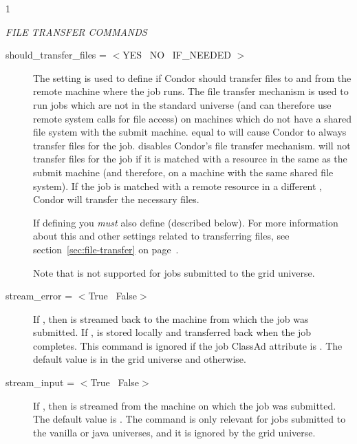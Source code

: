 \begin{ManPage}{\label{man-condor-submit}}{1}
\begin{description}
\end{description} 

\emph{FILE TRANSFER COMMANDS}
\begin{description} 


\item[should\_transfer\_files = $<$YES \Bar\ NO \Bar\ IF\_NEEDED $>$] 
The  setting is used to define if Condor
should transfer files to and from the remote machine where the job
runs.
The file transfer mechanism is used to run jobs which are not in the
standard universe (and can therefore use remote system calls for file
access) on machines which do not have a shared file system with the
submit machine.
 equal to  will cause Condor to
always transfer files for the job.
 disables Condor's file transfer mechanism.
 will not transfer files for the job if it is matched
with a resource in the same  as the submit
machine (and therefore, on a machine with the same shared file
system).
If the job is matched with a remote resource in a different 
, Condor will transfer the necessary files. 

If defining  you \emph{must} also
define  (described below).
For more information about this and other settings related to
transferring files, see section~\ref{sec:file-transfer} on
page~\pageref{sec:file-transfer}.

Note that  is not supported
for jobs submitted to the grid universe.

\item[stream\_error = $<$True \Bar\ False$>$]
If , then  is streamed back to
the machine from which the job was submitted.
If ,  is stored locally
and transferred back when the job completes.
This command is ignored if the job ClassAd attribute
 is
.
The default value is  in the grid
universe and  otherwise.

\item[stream\_input = $<$True \Bar\ False$>$]
If , then  is streamed from the
machine on which the job was submitted.
The default value is .
The command is only relevant for jobs submitted to
the vanilla or java universes, and
it is ignored by the grid
universe.


\end{description}
\end{ManPage}
